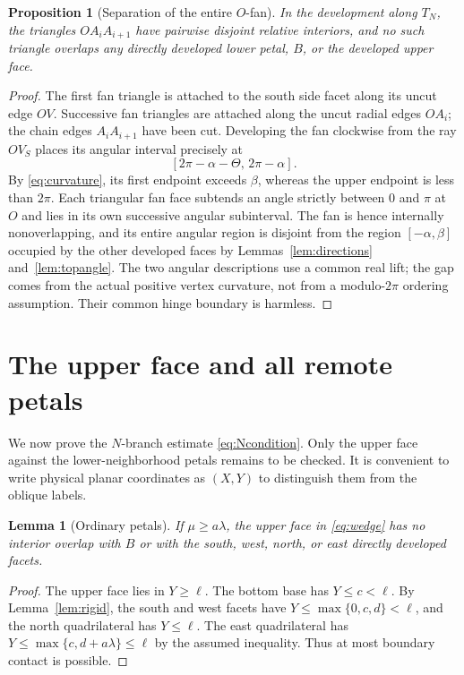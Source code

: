 \documentclass[a4paper,11pt]{amsart}
\newtheorem{proposition}[theorem]{Proposition}
\newtheorem{lemma}[theorem]{Lemma}
\begin{document}
\begin{proposition}[Separation of the entire $O$-fan]\label{prop:fan}
In the development along $T_N$, the triangles $OA_iA_{i+1}$ have pairwise disjoint relative interiors, and no such triangle overlaps any directly developed lower petal, $B$, or the developed upper face.
\end{proposition}
\begin{proof}
The first fan triangle is attached to the south side facet along its uncut edge $OV$. Successive fan triangles are attached along the uncut radial edges $OA_i$; the chain edges $A_iA_{i+1}$ have been cut. Developing the fan clockwise from the ray $OV_S$ places its angular interval precisely at
\[
 [2\pi-\alpha-\Theta,\,2\pi-\alpha].
\]
By \eqref{eq:curvature}, its first endpoint exceeds $\beta$, whereas the upper endpoint is less than $2\pi$. Each triangular fan face subtends an angle strictly between $0$ and $\pi$ at $O$ and lies in its own successive angular subinterval. The fan is hence internally nonoverlapping, and its entire angular region is disjoint from the region $[-\alpha,\beta]$ occupied by the other developed faces by Lemmas~\ref{lem:directions} and~\ref{lem:topangle}. The two angular descriptions use a common real lift; the gap comes from the actual positive vertex curvature, not from a modulo-$2\pi$ ordering assumption. Their common hinge boundary is harmless.
\end{proof}

\section{The upper face and all remote petals}
We now prove the $N$-branch estimate \eqref{eq:Ncondition}. Only the upper face against the lower-neighborhood petals remains to be checked. It is convenient to write physical planar coordinates as $(X,Y)$ to distinguish them from the oblique labels.

\begin{lemma}[Ordinary petals]\label{lem:ordinary}
If $\mu\geq a\lambda$, the upper face in \eqref{eq:wedge} has no interior overlap with $B$ or with the south, west, north, or east directly developed facets.
\end{lemma}
\begin{proof}
The upper face lies in $Y\geq\ell$. The bottom base has $Y\leq c<\ell$. By Lemma~\ref{lem:rigid}, the south and west facets have $Y\leq\max\{0,c,d\}<\ell$, and the north quadrilateral has $Y\leq\ell$. The east quadrilateral has $Y\leq\max\{c,d+a\lambda\}\leq\ell$ by the assumed inequality. Thus at most boundary contact is possible.
\end{proof}
\end{document}
